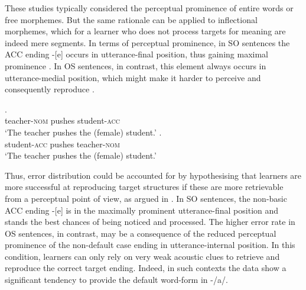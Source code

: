 These studies typically considered the perceptual prominence of entire words or free morphemes. But the same rationale can be applied to inflectional morphemes, which for a learner who does not process targets for meaning are indeed mere segments. In terms of perceptual prominence, in SO sentences the ACC ending -[e] occurs in utterance-final position, thus gaining maximal prominence . In OS sentences, in contrast, this element always occurs in utterance-medial position, which might make it harder to perceive and consequently reproduce .

\ea%
    \label{ex:08:9}
    \ea\label{ex:08:9a}
    .\\
            teacher-\textsc{nom}  pushes  student-\textsc{acc}\\
     \glt    ‘The teacher pushes the (female) student.’
    \ex\label{ex:08:9b}
    .\\
            student-\textsc{acc}  pushes  teacher-\textsc{nom}\\
     \glt    ‘The teacher pushes the (female) student.’
    \z
\z

Thus, error distribution could be accounted for by hypothesising that learners are more successful at reproducing target structures if these are more retrievable from a perceptual point of view, as argued in \citet{Saturno2015a}. In SO sentences, the non-basic ACC ending -[e] is in the maximally prominent utterance-final position and stands the best chances of being noticed and processed. The higher error rate in OS sentences, in contrast, may be a consequence of the reduced perceptual prominence of the non-default case ending in utterance-internal position. In this condition, learners can only rely on very weak acoustic clues to retrieve and reproduce the correct target ending. Indeed, in such contexts the data show a significant tendency to provide the default word-form in -/a/.

